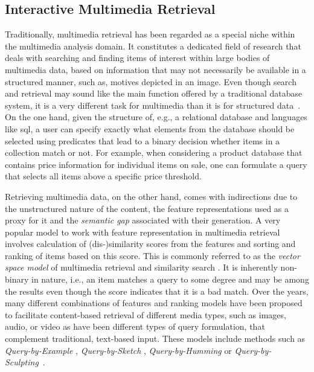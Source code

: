 \subsection{Interactive Multimedia Retrieval}

Traditionally, multimedia retrieval has been regarded as a special niche within the multimedia analysis domain. It constitutes a dedicated field of research that deals with searching and finding items of interest within large bodies of multimedia data, based on information that may not necessarily be available in a structured manner, such as, motives depicted in an image. Even though search and retrieval may sound like the main function offered by a traditional database system, it is a very different task for multimedia than it is for structured data~\cite{Blanken:2007multimedia}. On the one hand, given the structure of, e.g., a relational database and languages like \acrshort{sql}, a user can specify exactly what elements from the database should be selected using predicates that lead to a binary decision whether items in a collection match or not. For example, when considering a product database that contains price information for individual items on sale, one can formulate a query that selects all items above a specific price threshold.

Retrieving multimedia data, on the other hand, comes with indirections due to the unstructured nature of the content, the feature representations used as a proxy for it and the \emph{semantic gap} \cite{Smeulders:2000Content, Blanken:2007multimedia} associated with their generation. A very popular model to work with feature representation in multimedia retrieval involves calculation of (dis-)similarity scores from the features and sorting and ranking of items based on this score. This is commonly referred to as the \emph{vector space model} of multimedia retrieval and similarity search \cite{Zezula:2006Similarity}. It is inherently non-binary in nature, i.e., an item matches a query to some degree and may be among the results even though the score indicates that it is a bad match. Over the years, many different combinations of features and ranking models have been proposed to facilitate content-based retrieval of different media types, such as images, audio, or video \cite{Hu:2011Survey,Dharani:2013Survey,Murthy:2018Content} as have been different types of query formulation, that complement traditional, text-based input. These models include methods such as \emph{Query-by-Example} \cite{Kelly:1995Query}, \emph{Query-by-Sketch} \cite{Sciascio:1999Content}, \emph{Query-by-Humming} \cite{Ghias:1995query} or \emph{Query-by-Sculpting}~\cite{Boerlin:20203d}.


